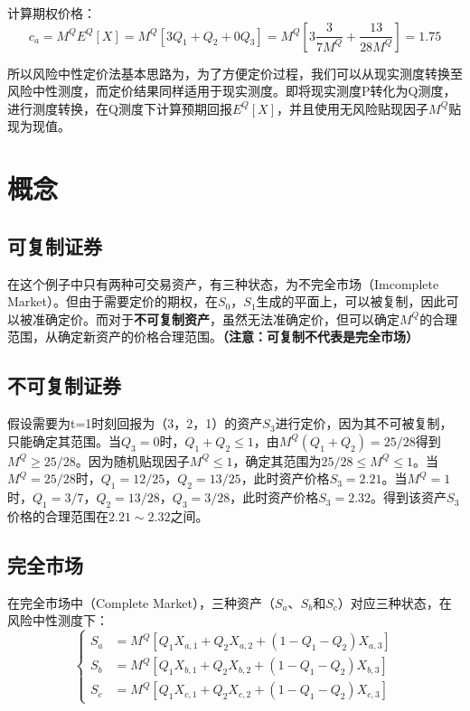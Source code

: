 \documentclass[11pt]{article}
\begin{document}
计算期权价格：
\begin{equation*}
 c_a = M^Q E^Q[X] = M^Q [3Q_1 + Q_2 + 0Q_3] = M^Q [3\frac{3}{7M^Q} + \frac{13}{28M^Q}] = 1.75
\end{equation*}

所以风险中性定价法基本思路为，为了方便定价过程，我们可以从现实测度转换至风险中性测度，而定价结果同样适用于现实测度。即将现实测度P转化为Q测度，进行测度转换，在Q测度下计算预期回报$E^Q[X]$，并且使用无风险贴现因子$M^Q$贴现为现值。

\section{概念}

\subsection*{可复制证券}
在这个例子中只有两种可交易资产，有三种状态，为不完全市场（Imcomplete Market）。但由于需要定价的期权，在$S_0$，$S_1$生成的平面上，可以被复制，因此可以被准确定价。而对于\textbf{不可复制资产}，虽然无法准确定价，但可以确定$M^Q$的合理范围，从确定新资产的价格合理范围。\textbf{（注意：可复制不代表是完全市场）}

\subsection*{不可复制证券}
假设需要为t=1时刻回报为（3，2，1）的资产$S_3$进行定价，因为其不可被复制，只能确定其范围。当$Q_3=0$时，$Q_1+Q_2\leq1$，由$M^Q(Q_1 + Q_2) = 25/28$得到$M^Q\geq25/28$。因为随机贴现因子$M^Q\leq1$，确定其范围为$ 25/28\leq M^Q\leq1$。当$M^Q=25/28$时，$Q_1=12/25$，$Q_2=13/25$，此时资产价格$S_3=2.21$。当$M^Q=1$时，$Q_1=3/7$，$Q_2=13/28$，$Q_3=3/28$，此时资产价格$S_3 = 2.32$。得到该资产$S_3$价格的合理范围在$2.21 \sim 2.32$之间。

\subsection*{完全市场}
在完全市场中（Complete Market），三种资产（$S_a$、$S_b$和$S_c$）对应三种状态，在风险中性测度下：
\begin{equation*}
  \left\{
    \begin{aligned}
      S_a &= M^Q[Q_1X_{a,1} + Q_2X_{a,2} + (1-Q_1-Q_2)X_{a,3}] \\
      S_b &= M^Q[Q_1X_{b,1} + Q_2X_{b,2} + (1-Q_1-Q_2)X_{b,3}] \\
      S_c &= M^Q[Q_1X_{c,1} + Q_2X_{c,2} + (1-Q_1-Q_2)X_{c,3}]
    \end{aligned}
  \right.
\end{equation*}
\end{document}
